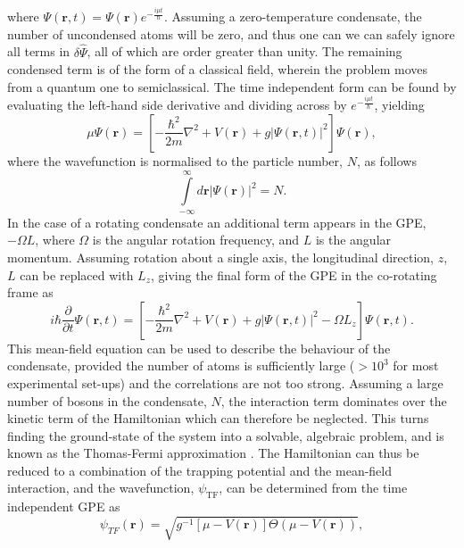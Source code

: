where $\Psi(\textbf{r},t) = \Psi(\textbf{r})e^{-\frac{i\mu t}{\hbar}}$.
Assuming a zero-temperature condensate, the number of uncondensed atoms will be zero, and thus one can we can safely ignore all terms in $\delta\hat{\Psi}$, all of which are order greater than unity. The remaining condensed term is of the form of a classical field, wherein the problem moves from a quantum one to semiclassical. The time independent form can be found by evaluating the left-hand side derivative and dividing across by $e^{-\frac{i\mu t}{\hbar}}$, yielding
\begin{equation}
\mu\Psi(\textbf{r}) = \left[-\frac{\hbar^2}{2m}\nabla^2 + V(\textbf{r}) + g\vert\Psi(\textbf{r},t)\vert^2 \right]\Psi(\textbf{r}),
\end{equation}
where the wavefunction is normalised to the particle number, $N$, as follows
\begin{equation}\label{eqn:norm}
\displaystyle\int\limits_{-\infty}^{\infty}d\textbf{r} \left\vert \Psi\left(\textbf{r}\right) \right\vert^2 = N.
\end{equation}
In the case of a rotating condensate an additional term appears in the GPE, $-\Omega L$, where $\Omega$ is the angular rotation frequency, and $L$ is the angular momentum. Assuming rotation about a single axis, the longitudinal direction, $z$, $L$ can be replaced with $L_z$, giving the final form of the GPE in the co-rotating frame as
\begin{equation}\label{eqn:gpe_rotation}
i\hbar\frac{\partial}{\partial t}\Psi(\textbf{r},t) = \left[-\frac{\hbar^2}{2m}\nabla^2 + V(\textbf{r}) + g\vert\Psi(\textbf{r},t)\vert^2 - \Omega L_z  \right]\Psi(\textbf{r},t).
\end{equation}
This mean-field equation can be used to describe the behaviour of the condensate, provided the number of atoms is sufficiently large ($>10^3$ for most experimental set-ups) and the correlations are not too strong. Assuming a large number of bosons in the condensate, $N$, the interaction term dominates over the kinetic term of the Hamiltonian which can therefore be neglected. This turns finding the ground-state of the system into a solvable, algebraic problem, and is known as the Thomas-Fermi approximation \cite[~p. 84]{BK:Ueda_2010}. The Hamiltonian can thus be reduced to a combination of the trapping potential and the mean-field interaction, and the wavefunction, $\psi_{\textrm{TF}}$, can be determined from the time independent GPE as
\begin{equation}
\psi_{TF}(\textbf{r}) = \sqrt{ g^{-1}[\mu - V(\textbf{r})] \Theta(\mu - V(\textbf{r}))},
\end{equation}
